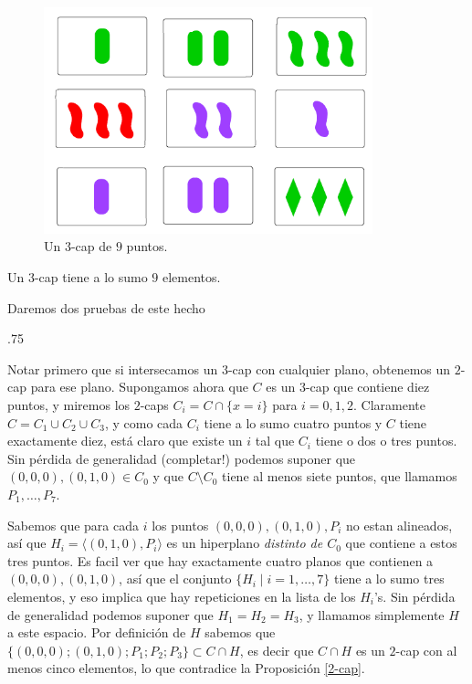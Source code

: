 \documentclass[11pt,fleqn]{article}
\makeatletter
\renewenvironment{proof}[1][Demostraci\'on]{\par
  \pushQED{\qed}%
  \normalfont \topsep.75\paraskip\relax
  \trivlist
  \item[\hskip\labelsep
        \itshape
    #1\@addpunct{.}]\ignorespaces
}{%
  \popQED\endtrivlist\@endpefalse
}
\makeatother
\begin{document}
\begin{figure}[h!]
\centering
\includegraphics[width=0.85\textwidth]{caps2}
\caption{Un $3$-cap de $9$ puntos.}
\end{figure}

\begin{Proposition}
\label{3-cap}
  Un $3$-cap tiene a lo sumo $9$ elementos.
\end{Proposition}
Daremos dos pruebas de este hecho
\begin{proof}
  Notar primero que si intersecamos un $3$-cap con cualquier plano, obtenemos un $2$-cap
  para ese plano. Supongamos ahora que $C$ es un $3$-cap que contiene diez puntos, y
  miremos los $2$-caps $C_i = C \cap \{x = i\}$ para $i = 0, 1, 2$. Claramente $C = C_1
  \cup C_2 \cup C_3$, y como cada $C_i$ tiene a lo sumo cuatro puntos y $C$ tiene
  exactamente diez, está claro que existe un $i$ tal que $C_i$ tiene o dos o tres puntos.
  Sin pérdida de generalidad (completar!) podemos suponer que $(0,0,0), (0,1,0) \in C_0$ y
  que $C \setminus C_0$ tiene al menos siete puntos, que llamamos $P_1, \ldots, P_7$.

  Sabemos que para cada $i$ los puntos $(0,0,0), (0,1,0), P_i$ no estan alineados, así que
  $H_i = \langle (0,1,0), P_i\rangle$ es un hiperplano \emph{distinto de $C_0$} que
  contiene a estos tres puntos. Es facil ver que hay exactamente cuatro planos que
  contienen a $(0,0,0), (0,1,0)$, así que el conjunto $\{H_i \mid i = 1, \ldots, 7\}$
  tiene a lo sumo tres elementos, y eso implica que hay repeticiones en la lista de los
  $H_i$'s. Sin pérdida de generalidad podemos suponer que $H_1 = H_2 = H_3$, y llamamos
  simplemente $H$ a este espacio. Por definición de $H$ sabemos que $\{(0,0,0); (0,1,0);
  P_1; P_2; P_3\} \subset C \cap H$, es decir que $C \cap H$ es un $2$-cap con al menos
  cinco elementos, lo que contradice la Proposición \ref{2-cap}.
\end{proof}
\end{document}
